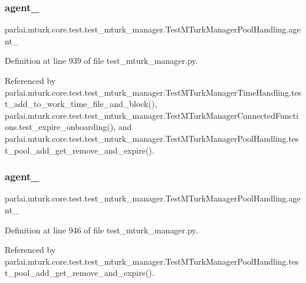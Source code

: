 \subsubsection{\texorpdfstring{agent\+\_}{agent\_2}}
{\footnotesize\ttfamily parlai.\+mturk.\+core.\+test.\+test\+\_\+mturk\+\_\+manager.\+Test\+M\+Turk\+Manager\+Pool\+Handling.\+agent\+\_}



Definition at line 939 of file test\+\_\+mturk\+\_\+manager.\+py.



Referenced by parlai.\+mturk.\+core.\+test.\+test\+\_\+mturk\+\_\+manager.\+Test\+M\+Turk\+Manager\+Time\+Handling.\+test\+\_\+add\+\_\+to\+\_\+work\+\_\+time\+\_\+file\+\_\+and\+\_\+block(), parlai.\+mturk.\+core.\+test.\+test\+\_\+mturk\+\_\+manager.\+Test\+M\+Turk\+Manager\+Connected\+Functions.\+test\+\_\+expire\+\_\+onboarding(), and parlai.\+mturk.\+core.\+test.\+test\+\_\+mturk\+\_\+manager.\+Test\+M\+Turk\+Manager\+Pool\+Handling.\+test\+\_\+pool\+\_\+add\+\_\+get\+\_\+remove\+\_\+and\+\_\+expire().

\mbox{\label{classparlai_1_1mturk_1_1core_1_1test_1_1test__mturk__manager_1_1TestMTurkManagerPoolHandling_a81504af6fd91297fbf6271d46ed30a1c}} 
\subsubsection{\texorpdfstring{agent\+\_}{agent\_3}}
{\footnotesize\ttfamily parlai.\+mturk.\+core.\+test.\+test\+\_\+mturk\+\_\+manager.\+Test\+M\+Turk\+Manager\+Pool\+Handling.\+agent\+\_}



Definition at line 946 of file test\+\_\+mturk\+\_\+manager.\+py.



Referenced by parlai.\+mturk.\+core.\+test.\+test\+\_\+mturk\+\_\+manager.\+Test\+M\+Turk\+Manager\+Pool\+Handling.\+test\+\_\+pool\+\_\+add\+\_\+get\+\_\+remove\+\_\+and\+\_\+expire().

